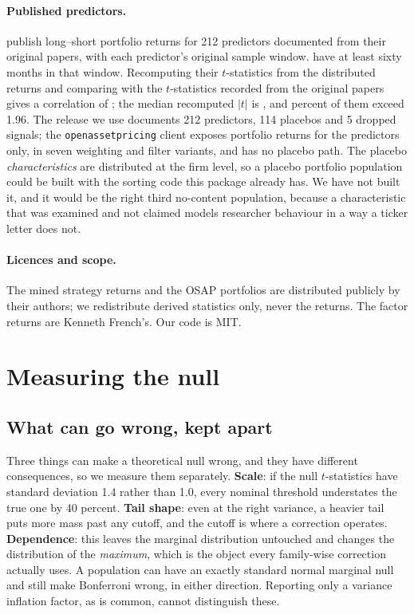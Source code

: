 \documentclass{article}
\begin{document}
\paragraph{Published predictors.}
\citet{chen2022osap} publish long--short portfolio returns for 212 predictors
documented from their original papers, with each predictor's original sample
window. \bzoopublishedN{} have at least sixty months in that window. Recomputing
their $t$-statistics from the distributed returns and comparing with the
$t$-statistics recorded from the original papers gives a correlation of
\bzooreproCorr{}; the median recomputed $|t|$ is \bzoopublishedMedianT{}, and
\bzoopublishedShareTwoPct{} percent of them exceed 1.96. The release we use
documents 212 predictors, 114 placebos and 5 dropped signals; the
\texttt{openassetpricing} client exposes portfolio returns for the predictors
only, in seven weighting and filter variants, and has no placebo path. The
placebo \emph{characteristics} are distributed at the firm level, so a placebo
portfolio population could be built with the sorting code this package already
has. We have not built it, and it would be the right third no-content
population, because a characteristic that was examined and not claimed models
researcher behaviour in a way a ticker letter does not.

\paragraph{Licences and scope.} The mined strategy returns and the OSAP
portfolios are distributed publicly by their authors; we redistribute derived
statistics only, never the returns. The factor returns are Kenneth French's.
Our code is MIT.

\section{Measuring the null}
\label{sec:null}

\subsection{What can go wrong, kept apart}

Three things can make a theoretical null wrong, and they have different
consequences, so we measure them separately. \textbf{Scale}: if the null
$t$-statistics have standard deviation 1.4 rather than 1.0, every nominal
threshold understates the true one by 40 percent. \textbf{Tail shape}: even at
the right variance, a heavier tail puts more mass past any cutoff, and the
cutoff is where a correction operates. \textbf{Dependence}: this leaves the
marginal distribution untouched and changes the distribution of the
\emph{maximum}, which is the object every family-wise correction actually uses.
A population can have an exactly standard normal marginal null and still make
Bonferroni wrong, in either direction. Reporting only a variance inflation
factor, as is common, cannot distinguish these.
\end{document}
